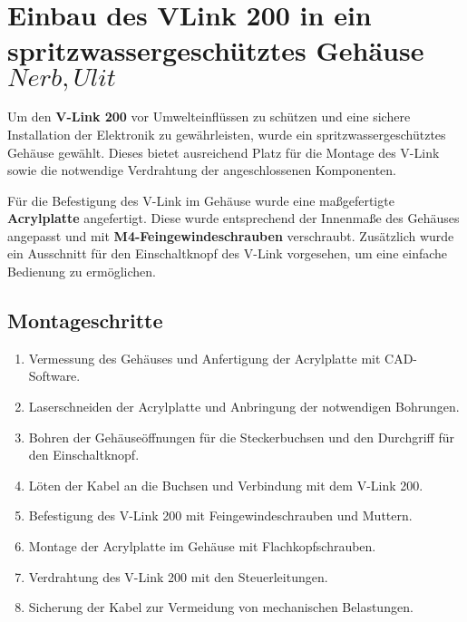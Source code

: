 \section{Einbau des V\-Link 200 in ein spritzwassergesch\"utztes Geh\"ause \(Nerb, Ulit\)}
Um den \textbf{V-Link 200} vor Umwelteinflüssen zu schützen und eine sichere Installation der Elektronik zu gewährleisten, wurde ein spritzwassergeschütztes Gehäuse gewählt. Dieses bietet ausreichend Platz für die Montage des V-Link sowie die notwendige Verdrahtung der angeschlossenen Komponenten.

Für die Befestigung des V-Link im Gehäuse wurde eine maßgefertigte \textbf{Acrylplatte} angefertigt. Diese wurde entsprechend der Innenmaße des Gehäuses angepasst und mit \textbf{M4-Feingewindeschrauben} verschraubt. Zusätzlich wurde ein Ausschnitt für den Einschaltknopf des V-Link vorgesehen, um eine einfache Bedienung zu ermöglichen.
\subsection{Montageschritte}

\begin{enumerate}
    \item Vermessung des Gehäuses und Anfertigung der Acrylplatte mit CAD-Software.
    \item Laserschneiden der Acrylplatte und Anbringung der notwendigen Bohrungen.
    \item Bohren der Gehäuseöffnungen für die Steckerbuchsen und den Durchgriff für den Einschaltknopf.
    \item Löten der Kabel an die Buchsen und Verbindung mit dem V-Link 200.
    \item Befestigung des V-Link 200 mit Feingewindeschrauben und Muttern.
    \item Montage der Acrylplatte im Gehäuse mit Flachkopfschrauben.
    \item Verdrahtung des V-Link 200 mit den Steuerleitungen.
    \item Sicherung der Kabel zur Vermeidung von mechanischen Belastungen.
\end{enumerate}


